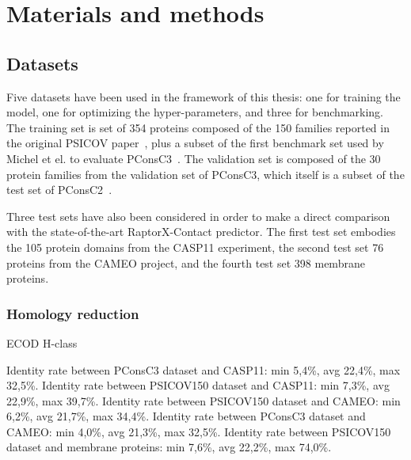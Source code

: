 \chapter{Materials and methods}

\section{Datasets}

  Five datasets have been used in the framework of this thesis:
  one for training the model, one for optimizing the hyper-parameters, and three for benchmarking.
  The training set is set of 354 proteins composed of the 150 families reported in the original PSICOV
  paper~\cite{doi:10.1093/bioinformatics/btr638}, plus a subset of the first benchmark set used by
  Michel et el. to evaluate PConsC3~\cite{Skwark079673}.
  The validation set is composed of the 30 protein families from the validation set of PConsC3,
  which itself is a subset of the test set of PConsC2~\cite{10.1371/journal.pcbi.1003889}.

  Three test sets have also been considered in order to make a direct comparison with the state-of-the-art RaptorX-Contact predictor.
  The first test set embodies the 105 protein domains from the CASP11 experiment, the second test set 76 proteins from the CAMEO
  project, and the fourth test set 398 membrane proteins.

  \subsection{Homology reduction}


    ECOD H-class~\cite{10.1371/journal.pcbi.1003926}

    Identity rate between PConsC3 dataset and CASP11: min 5,4\%, avg 22,4\%, max 32,5\%.
    Identity rate between PSICOV150 dataset and CASP11: min 7,3\%, avg 22,9\%, max 39,7\%.
    Identity rate between PSICOV150 dataset and CAMEO: min 6,2\%, avg 21,7\%, max 34,4\%.
    Identity rate between PConsC3 dataset and CAMEO: min 4,0\%, avg 21,3\%, max 32,5\%.
    Identity rate between PSICOV150 dataset and membrane proteins: min 7,6\%, avg 22,2\%, max 74,0\%.

